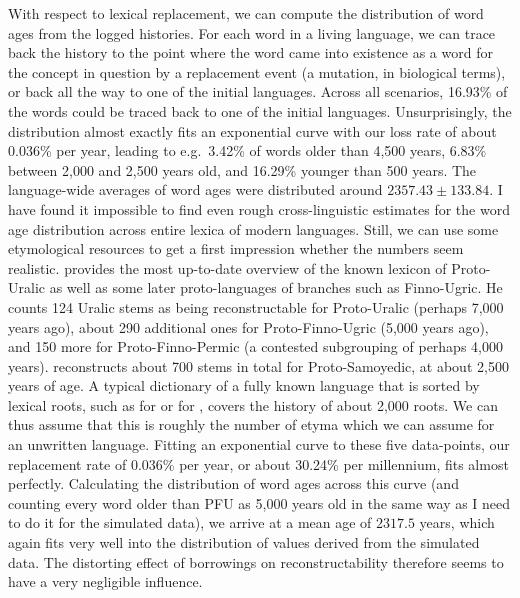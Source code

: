 With respect to lexical replacement, we can compute the distribution of word ages from the logged histories. For each word in a living language, we can trace back the history to the point where the word came into existence as a word for the concept in question by a replacement event (a mutation, in biological terms), or back all the way to one of the initial languages. Across all scenarios, 16.93\% of the words could be traced back to one of the initial languages. Unsurprisingly, the distribution almost exactly fits an exponential curve with our loss rate of about 0.036\% per year, leading to e.g.\ 3.42\% of words older than 4,500 years, 6.83\% between 2,000 and 2,500 years old, and 16.29\% younger than 500 years. The language-wide averages of word ages were distributed around $2357.43 \pm 133.84$. I have found it impossible to find even rough cross-linguistic estimates for the word age distribution across entire lexica of modern languages. Still, we can use some etymological resources to get a first 
impression whether the numbers seem realistic. \cite{sammallahti1988} provides the most up-to-date overview of the known lexicon of Proto-Uralic as well as some later proto-languages of branches such as Finno-Ugric. He counts 124 Uralic stems as being reconstructable for Proto-Uralic (perhaps 7,000 years ago), about 290 additional ones for Proto-Finno-Ugric (5,000 years ago), and 150 more for Proto-Finno-Permic (a contested subgrouping of perhaps 4,000 years). \cite{janhunen1977} reconstructs about 700 stems in total for Proto-Samoyedic, at about 2,500 years of age. A typical dictionary of a fully known language that is sorted by lexical roots, such as \cite{de_vaan_2008} for  or \cite{lehtisalo_1956} for , covers the history of about 2,000 roots. We can thus assume that this is roughly the number of etyma which we can assume for an unwritten language. Fitting an exponential curve to these 
five data-points, our replacement rate of 0.036\% per year, or about 30.24\% per millennium, fits almost perfectly. Calculating the distribution of word ages across this curve (and counting every word older than PFU as 5,000 years old in the same way as I need to do it for the simulated data), we arrive at a mean age of $2317.5$ years, which again fits very well into the distribution of values derived from the simulated data. The distorting effect of borrowings on reconstructability therefore seems to have a very negligible influence.

